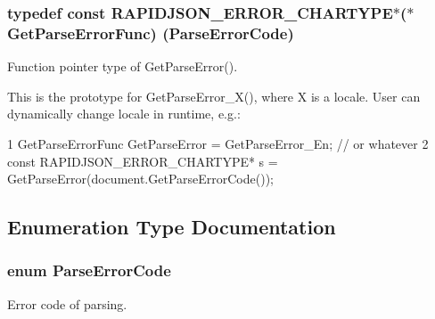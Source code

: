 \subsubsection[{\texorpdfstring{Get\+Parse\+Error\+Func}{GetParseErrorFunc}}]{\setlength{\rightskip}{0pt plus 5cm}typedef const {\bf R\+A\+P\+I\+D\+J\+S\+O\+N\+\_\+\+E\+R\+R\+O\+R\+\_\+\+C\+H\+A\+R\+T\+Y\+PE}$\ast$($\ast$ Get\+Parse\+Error\+Func) ({\bf Parse\+Error\+Code})}\hypertarget{group___r_a_p_i_d_j_s_o_n___e_r_r_o_r_s_ga586548166441ab3ce30219cb35be2e04}{}\label{group___r_a_p_i_d_j_s_o_n___e_r_r_o_r_s_ga586548166441ab3ce30219cb35be2e04}


Function pointer type of Get\+Parse\+Error(). 

This is the prototype for {\ttfamily Get\+Parse\+Error\+\_\+\+X()}, where {\ttfamily X} is a locale. User can dynamically change locale in runtime, e.\+g.\+: 
\begin{DoxyCode}
1 GetParseErrorFunc GetParseError = GetParseError\_En; // or whatever
2 const RAPIDJSON\_ERROR\_CHARTYPE* s = GetParseError(document.GetParseErrorCode());
\end{DoxyCode}
 

\subsection{Enumeration Type Documentation}
\subsubsection[{\texorpdfstring{Parse\+Error\+Code}{ParseErrorCode}}]{\setlength{\rightskip}{0pt plus 5cm}enum {\bf Parse\+Error\+Code}}\hypertarget{group___r_a_p_i_d_j_s_o_n___e_r_r_o_r_s_ga8d4b32dfc45840bca189ade2bbcb6ba7}{}\label{group___r_a_p_i_d_j_s_o_n___e_r_r_o_r_s_ga8d4b32dfc45840bca189ade2bbcb6ba7}


Error code of parsing. 

